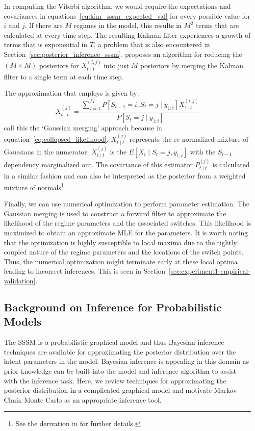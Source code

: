 In computing the Viterbi algorithm, we would require the expectations and covariances in equations~\ref{eq:kim_sssm_expected_val} for every possible value for $i$ and $j$. If there are $M$ regimes in the model, this results in $M^2$ terms that are calculated at every time step. The resulting Kalman filter experiences a growth of terms that is exponential in $T$, a problem that is also encountered in Section~\ref{sec:posterior_inference_sssm}. \cite{kim1994dynamic} proposes an algorithm for reducing the $(M \times M)$ posteriors for $X_{t \mid t}^{(i,j)}$ into just $M$ posteriors by merging the Kalman filter to a single term at each time step.

The approximation that \cite{kim1994dynamic} employs is given by:
\begin{equation}\label{eq:collapsed_likelihood}
  X_{t \mid t}^{(j)} = \frac{\sum\limits_{i=1}^{M} P[S_{t-1}=i, S_t=j \mid y_{1:t}]X_{t \mid t}^{(i,j)}}{P[S_t = j \mid y_{1:t}]}
\end{equation}
\cite{ghahramani2000variational} call this the `Gaussian merging' approach because in equation~\ref{eq:collapsed_likelihood}, $X_{t \mid t}^{(j)}$ represents the re-normalized mixture of Gaussians in the numerator. $X_{t \mid t}^{(j)}$ is the $E[X_t \mid S_t = j, y_{1:t}]$ with the $S_{t-1}$ dependency marginalized out. The covariance of this estimator $P_{t \mid t}^{(j)}$ is calculated in a similar fashion and can also be interpreted as the posterior from a weighted mixture of normals\footnote{See the derivation in \cite{kim1994dynamic} for further details.}.

Finally, we can use numerical optimization to perform parameter estimation. The Gaussian merging is used to construct a forward filter to approximate the likelihood of the regime parameters and the associated switches. This likelihood is maximized to obtain an approximate MLE for the parameters. It is worth noting that the optimization is highly susceptible to local maxima due to the tightly coupled nature of the regime parameters and the locations of the switch points. Thus, the numerical optimization might terminate early at these local optima leading to incorrect inferences. This is seen in Section~\ref{sec:experiment1-empirical-validation}.

\subsection{Background on Inference for Probabilistic Models}
The SSSM is a probabilistic graphical model and thus Bayesian inference techniques are available for approximating the posterior distribution over the latent parameters in the model. Bayesian inference is appealing in this domain as prior knowledge can be built into the model and inference algorithm to assist with the inference task. Here, we review techniques for approximating the posterior distribution in a complicated graphical model and motivate Markov Chain Monte Carlo as an appropriate inference tool.


